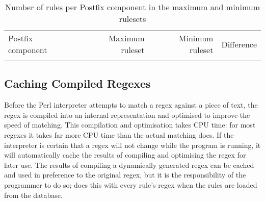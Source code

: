 

\begin{table}[thbp]
    \caption{Number of rules per Postfix component in the maximum and
    minimum rulesets}
    \empty{}\label{Number of rules per Postfix component in the maximum and
    minimum rulesets}
    \centering{}
    \begin{tabular}{lrrr}
        \tabletopline{}%
        Postfix component & Maximum ruleset & Minimum ruleset & Difference \\
        \tablemiddleline{}%
        
        \tablebottomline{}%
    \end{tabular}
\end{table}

\FloatBarrier{}

\subsection{Caching Compiled Regexes}

\label{Caching compiled regexes}

Before the Perl interpreter attempts to match a regex against a piece of
text, the regex is compiled into an internal representation and optimised
to improve the speed of matching.  This compilation and optimisation takes
CPU time: for most regexes it takes far more CPU time than the actual
matching does.  If the interpreter is certain that a regex will not change
while the program is running, it will automatically cache the results of
compiling and optimising the regex for later use.  The results of compiling
a dynamically generated regex can be cached and used in preference to the
original regex, but it is the responsibility of the programmer to do so;
\parsername{} does this with every rule's regex when the rules are loaded
from the database.

